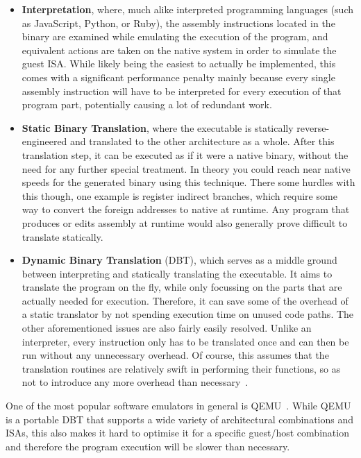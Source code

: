 \begin{itemize}
    \item \textbf{Interpretation}, where, much alike interpreted programming languages (such as JavaScript, Python, or Ruby), the assembly instructions located in the binary are examined while emulating the execution of the program, and equivalent actions are taken on the native system in order to simulate the guest ISA\@.
        \subitem While likely being the easiest to actually be implemented, this comes with a significant performance penalty mainly because every single assembly instruction will have to be interpreted for every execution of that program part, potentially causing a lot of redundant work.
    \item \textbf{Static Binary Translation}, where the executable is statically reverse-engineered and translated to the other architecture as a whole.
    After this translation step, it can be executed as if it were a native binary, without the need for any further special treatment.
    In theory you could reach near native speeds for the generated binary using this technique.
    There some hurdles with this though, one example is register indirect branches, which require some way to convert the foreign addresses to native at runtime.
    Any program that produces or edits assembly at runtime would also generally prove difficult to translate statically.
    \item \textbf{Dynamic Binary Translation} (DBT), which serves as a middle ground between interpreting and statically translating the executable.
    It aims to translate the program on the fly, while only focussing on the parts that are actually needed for execution.
    Therefore, it can save some of the overhead of a static translator by not spending execution time on unused code paths.
    The other aforementioned issues are also fairly easily resolved.
    Unlike an interpreter, every instruction only has to be translated once and can then be run without any unnecessary overhead.
    Of course, this assumes that the translation routines are relatively swift in performing their functions, so as not to introduce any more overhead than necessary~\cite[S. 1f.]{bintrans}.
\end{itemize}

One of the most popular software emulators in general is QEMU~\cite{bellard2005qemu}\@.
While QEMU is a portable DBT that supports a wide variety of architectural combinations and ISAs, this also makes it hard to optimise it for a specific guest/host combination and therefore the program execution will be slower than necessary.

